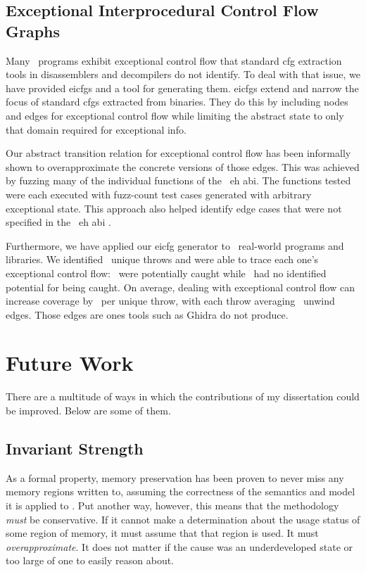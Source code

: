 \subsection{Exceptional Interprocedural Control Flow Graphs}
Many \Cpp\ programs exhibit exceptional control flow that standard \ac{cfg} extraction tools in disassemblers and decompilers do not identify.
To deal with that issue, we have provided \acp{eicfg} and a tool for generating them.
\acp{eicfg} extend and narrow the focus of standard \acp{cfg} extracted from binaries.
They do this by including nodes and edges for exceptional control flow while limiting the abstract state to only that domain required for exceptional info.

Our abstract transition relation for exceptional control flow has been informally shown to overapproximate the concrete versions of those edges.
This was achieved by fuzzing many of the individual functions of the \Cpp\ \ac{eh} \ac{abi}.
The functions tested were each executed with \gls{fuzz-count} test cases generated with arbitrary exceptional state.
This approach also helped identify edge cases that were not specified in the \Cpp\ \ac{eh} \ac{abi} \cite{cxxEhAbi}.

Furthermore, we have applied our \ac{eicfg} generator to \totalbins\ real-world programs and libraries.
We identified \uniquethrows\ unique throws and were able to trace each one's exceptional control flow: \caughtthrows\ were potentially caught while \uncaughtthrows\ had no identified potential for being caught.
On average, dealing with exceptional control flow can increase coverage by \avgdiffinst\ per unique throw, with each throw averaging \avgunwinds\ unwind edges.
Those edges are ones tools such as Ghidra do not produce.

\section{Future Work}
There are a multitude of ways in which the contributions of my dissertation could be improved.
Below are some of them.

\subsection{Invariant Strength}
As a formal property, memory preservation has been proven to never miss any memory regions written to, assuming the correctness of the semantics and model it is applied to \autocite{bockenek2019preservation,verbeek2022lifting}.
Put another way, however, this means that the methodology \emph{must} be conservative.
If it cannot make a determination about the usage status of some region of memory,
it must assume that that region is used. It must \emph{overapproximate}.%
It does not matter if the cause was an underdeveloped state or too large of one to easily reason about.

